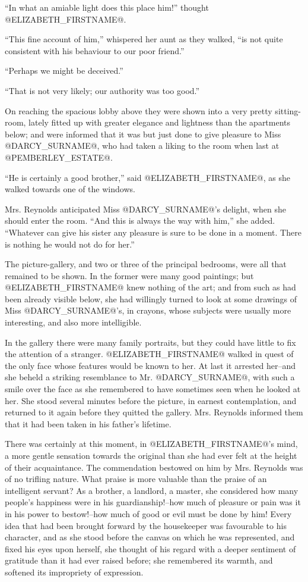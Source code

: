 ``In what an amiable light does this place him!'' thought @ELIZABETH_FIRSTNAME@.

``This fine account of him,'' whispered her aunt as they walked, ``is not
quite consistent with his behaviour to our poor friend.''

``Perhaps we might be deceived.''

``That is not very likely; our authority was too good.''

On reaching the spacious lobby above they were shown into a very pretty
sitting-room, lately fitted up with greater elegance and lightness than
the apartments below; and were informed that it was but just done to
give pleasure to Miss @DARCY_SURNAME@, who had taken a liking to the room when
last at @PEMBERLEY_ESTATE@.

``He is certainly a good brother,'' said @ELIZABETH_FIRSTNAME@, as she walked towards
one of the windows.

Mrs. Reynolds anticipated Miss @DARCY_SURNAME@'s delight, when she should enter
the room. ``And this is always the way with him,'' she added. ``Whatever
can give his sister any pleasure is sure to be done in a moment. There
is nothing he would not do for her.''

The picture-gallery, and two or three of the principal bedrooms, were
all that remained to be shown. In the former were many good paintings;
but @ELIZABETH_FIRSTNAME@ knew nothing of the art; and from such as had been already
visible below, she had willingly turned to look at some drawings of Miss
@DARCY_SURNAME@'s, in crayons, whose subjects were usually more interesting, and
also more intelligible.

In the gallery there were many family portraits, but they could have
little to fix the attention of a stranger. @ELIZABETH_FIRSTNAME@ walked in quest of
the only face whose features would be known to her. At last it arrested
her--and she beheld a striking resemblance to Mr. @DARCY_SURNAME@, with such a
smile over the face as she remembered to have sometimes seen when he
looked at her. She stood several minutes before the picture, in earnest
contemplation, and returned to it again before they quitted the gallery.
Mrs. Reynolds informed them that it had been taken in his father's
lifetime.

There was certainly at this moment, in @ELIZABETH_FIRSTNAME@'s mind, a more gentle
sensation towards the original than she had ever felt at the height of
their acquaintance. The commendation bestowed on him by Mrs. Reynolds
was of no trifling nature. What praise is more valuable than the praise
of an intelligent servant? As a brother, a landlord, a master, she
considered how many people's happiness were in his guardianship!--how
much of pleasure or pain was it in his power to bestow!--how much of
good or evil must be done by him! Every idea that had been brought
forward by the housekeeper was favourable to his character, and as she
stood before the canvas on which he was represented, and fixed his
eyes upon herself, she thought of his regard with a deeper sentiment of
gratitude than it had ever raised before; she remembered its warmth, and
softened its impropriety of expression.

